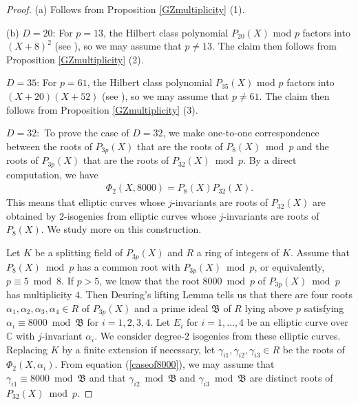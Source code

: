 \documentclass[a4paper, 11pt]{article}
\theoremstyle{plain}
\newcommand{\?}{\textcolor{red}{??}}
\newcommand{\bC}{\mathbb{C}}
\begin{document}
\begin{proof}
(a) Follows from Proposition \ref{GZmultiplicity} (1).

(b) $D=20$: For $p=13$, the Hilbert class polynomial $P_{20}(X)$ mod $p$ factors into $(X+8)^2$ (see \cite[14]{Github}), so we may assume that $p \ne 13$. The claim then follows from Proposition \ref{GZmultiplicity} (2).

$D=35$: For $p=61$, the Hilbert class polynomial $P_{35}(X)$ mod $p$ factors into $(X+20)(X+52)$ (see \cite[14]{Github}), so we may assume that $p \ne 61$. The claim then follows from Proposition \ref{GZmultiplicity} (3).

$D=32:$ To prove the case of $D=32$, we make one-to-one correspondence between the roots of $P_{3p}(X)$ that are the roots of $P_8(X) \bmod p$ and the roots of $P_{3p}(X)$ that are the roots of $P_{32}(X) \bmod p$. By a direct computation, we have
    \begin{align}
    \label{caseof8000}
        \Phi_2(X,8000) = P_8(X)P_{32}(X).
    \end{align}
This means that elliptic curves whose $j$-invariants are roots of $P_{32}(X)$
are obtained by $2$-isogenies from  elliptic curves whose $j$-invariants are roots of $P_{8}(X)$. We study more on this construction. 

Let $K$ be a splitting field of $P_{3p}(X)$ and $R$ a ring of integers of $K$.  Assume that $P_8(X) \bmod p$ has a common root with $P_{3p}(X) \bmod p$, or equivalently, $p\equiv5 \bmod 8$. If $p>5$, we know that the root $8000 \bmod p$ of $P_{3p}(X) \bmod p$ has multiplicity $4$. Then Deuring's lifting Lemma tells us that there are four roots $\alpha_1,\alpha_2,\alpha_3,\alpha_4\in R$ of $P_{3p}(X)$ and a prime ideal $\mathfrak{B}$ of $R$ lying above $p$ satisfying $\alpha_i \equiv 8000 \bmod \mathfrak{B}$ for $i=1,2,3,4$. Let $E_i$ for $i=1,\ldots, 4$ be an elliptic curve over $\bC$ with $j$-invariant $\alpha_i$. We consider degree-$2$ isogenies from these elliptic curves.  Replacing $K$ by a finite extension if necessary, let $\gamma_{i1},\gamma_{i2},\gamma_{i3}\in R$ be the roots of $\Phi_2(X,\alpha_i)$. From equation (\ref{caseof8000}), we may assume that $\gamma_{i1} \equiv8000 \bmod \mathfrak{B} $ and that $\gamma_{i2} \bmod\mathfrak{B} $ and $\gamma_{i3}  \bmod \mathfrak{B}$ are distinct roots of $P_{32}(X) \bmod p$. 


\end{proof}
\end{document}
